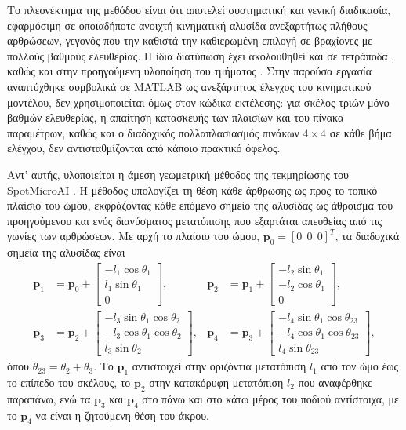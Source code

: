 \documentclass[11pt]{report}
\begin{document}
Το πλεονέκτημα της μεθόδου είναι ότι αποτελεί συστηματική και γενική διαδικασία,
εφαρμόσιμη σε οποιαδήποτε ανοιχτή κινηματική αλυσίδα ανεξαρτήτως πλήθους
αρθρώσεων, γεγονός που την καθιστά την καθιερωμένη επιλογή σε βραχίονες με
πολλούς βαθμούς ελευθερίας. Η ίδια διατύπωση έχει ακολουθηθεί και σε τετράποδα
\cite{rahman_kinematics_2022,liu_turning_2017}, καθώς και στην προηγούμενη
υλοποίηση του τμήματος \cite{tsiatsianas_quadruped_2024}. Στην παρούσα εργασία
αναπτύχθηκε συμβολικά σε MATLAB ως
ανεξάρτητος έλεγχος του κινηματικού μοντέλου, δεν χρησιμοποιείται όμως στον
κώδικα εκτέλεσης: για σκέλος τριών μόνο βαθμών ελευθερίας, η απαίτηση
κατασκευής των πλαισίων και του πίνακα παραμέτρων, καθώς και ο διαδοχικός
πολλαπλασιασμός πινάκων $4\times4$ σε κάθε βήμα ελέγχου, δεν αντισταθμίζονται
από κάποιο πρακτικό όφελος.

Αντ' αυτής, υλοποιείται η άμεση γεωμετρική μέθοδος της τεκμηρίωσης του
SpotMicroAI \cite{spotmicroai_project}. Η μέθοδος υπολογίζει τη θέση κάθε άρθρωσης ως προς
το τοπικό πλαίσιο του ώμου, εκφράζοντας κάθε επόμενο σημείο της αλυσίδας ως
άθροισμα του προηγούμενου και ενός διανύσματος μετατόπισης που εξαρτάται
απευθείας από τις γωνίες των αρθρώσεων. Με αρχή το πλαίσιο του ώμου,
$\mathbf{p}_0 = [0\ \ 0\ \ 0]^{T}$, τα διαδοχικά σημεία της αλυσίδας είναι
\begin{align}
\mathbf{p}_1 &= \mathbf{p}_0 +
\begin{bmatrix} -l_1\cos\theta_1 \\ l_1\sin\theta_1 \\ 0 \end{bmatrix},
&
\mathbf{p}_2 &= \mathbf{p}_1 +
\begin{bmatrix} -l_2\sin\theta_1 \\ -l_2\cos\theta_1 \\ 0 \end{bmatrix},
\label{eq:fk-p1p2} \\[4pt]
\mathbf{p}_3 &= \mathbf{p}_2 +
\begin{bmatrix} -l_3\sin\theta_1\cos\theta_2 \\ -l_3\cos\theta_1\cos\theta_2 \\
l_3\sin\theta_2 \end{bmatrix},
&
\mathbf{p}_4 &= \mathbf{p}_3 +
\begin{bmatrix} -l_4\sin\theta_1\cos\theta_{23} \\
-l_4\cos\theta_1\cos\theta_{23} \\ l_4\sin\theta_{23} \end{bmatrix},
\label{eq:fk-p3p4}
\end{align}
όπου $\theta_{23} = \theta_2 + \theta_3$. Το $\mathbf{p}_1$ αντιστοιχεί στην
οριζόντια μετατόπιση $l_1$ από τον ώμο έως το επίπεδο του σκέλους, το
$\mathbf{p}_2$ στην κατακόρυφη μετατόπιση $l_2$ που αναφέρθηκε παραπάνω, ενώ τα
$\mathbf{p}_3$ και $\mathbf{p}_4$ στο πάνω και στο κάτω μέρος του ποδιού
αντίστοιχα, με το $\mathbf{p}_4$ να είναι η ζητούμενη θέση του άκρου.
\end{document}
